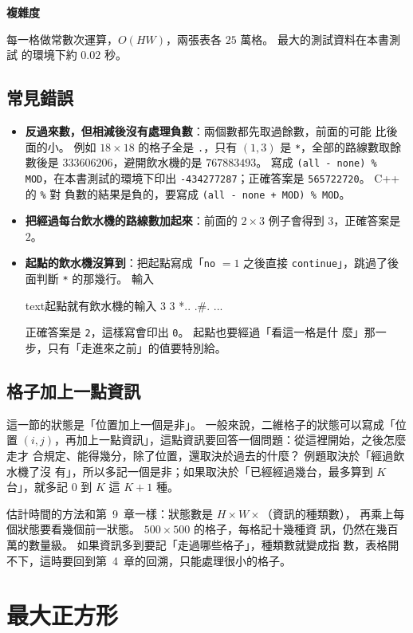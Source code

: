 \textbf{複雜度}

每一格做常數次運算，$O(HW)$，兩張表各 $25$ 萬格。 最大的測試資料在本書測試
的環境下約 $0.02$ 秒。

\subsection{常見錯誤}
\label{sec:dp2-fountain-err}

\begin{itemize}
\item \textbf{反過來數，但相減後沒有處理負數}：兩個數都先取過餘數，前面的可能
比後面的小。 例如 $18 \times 18$ 的格子全是 \texttt{.}，只有 $(1, 3)$ 是
\texttt{*}，全部的路線數取餘數後是 $333606206$，避開飲水機的是 $767883493$。
寫成 \texttt{(all - none) \% MOD}，在本書測試的環境下印出
\texttt{-434277287}；正確答案是 \texttt{565722720}。 C++ 的 \texttt{\%} 對
負數的結果是負的，要寫成 \texttt{(all - none + MOD) \% MOD}。
\item \textbf{把經過每台飲水機的路線數加起來}：前面的 $2 \times 3$ 例子會得到
$3$，正確答案是 $2$。
\item \textbf{起點的飲水機沒算到}：把起點寫成「\texttt{no} $= 1$ 之後直接
\texttt{continue}」，跳過了後面判斷 \texttt{*} 的那幾行。 輸入
\begin{code}{text}{起點就有飲水機的輸入}
3 3
*..
.#.
...
\end{code}
正確答案是 \texttt{2}，這樣寫會印出 \texttt{0}。 起點也要經過「看這一格是什
麼」那一步，只有「走進來之前」的值要特別給。
\end{itemize}

\subsection{格子加上一點資訊}

這一節的狀態是「位置加上一個是非」。 一般來說，二維格子的狀態可以寫成「位置
$(i, j)$，再加上一點資訊」，這點資訊要回答一個問題：從這裡開始，之後怎麼走才
合規定、能得幾分，除了位置，還取決於過去的什麼？ 例題取決於「經過飲水機了沒
有」，所以多記一個是非；如果取決於「已經經過幾台，最多算到 $K$ 台」，就多記
$0$ 到 $K$ 這 $K + 1$ 種。

估計時間的方法和第~9~章一樣：狀態數是 $H \times W \times$（資訊的種類數），
再乘上每個狀態要看幾個前一狀態。 $500 \times 500$ 的格子，每格記十幾種資
訊，仍然在幾百萬的數量級。 如果資訊多到要記「走過哪些格子」，種類數就變成指
數，表格開不下，這時要回到第~4~章的回溯，只能處理很小的格子。

\section{最大正方形}
\label{sec:dp2-square}

